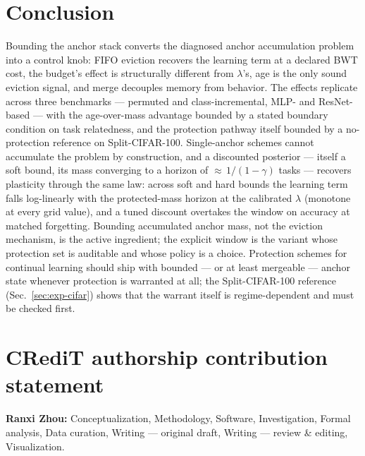 \documentclass[review,12pt,number]{elsarticle}
\begin{document}
\section{Conclusion}
\label{sec:conclusion}

Bounding the anchor stack converts the diagnosed anchor accumulation
problem into a control knob: FIFO eviction recovers the learning
term at a declared BWT cost, the budget's effect is structurally
different from $\lambda$'s, age is the only sound eviction signal,
and merge decouples memory from behavior. The effects replicate
across three benchmarks --- permuted and class-incremental, MLP- and
ResNet-based --- with the age-over-mass advantage bounded by a stated
boundary condition on task relatedness, and the protection pathway
itself bounded by a no-protection reference on Split-CIFAR-100.
Single-anchor schemes cannot accumulate the problem by construction,
and a discounted posterior --- itself a soft bound, its mass
converging to a horizon of ${\approx}\,1/(1-\gamma)$ tasks --- recovers
plasticity through the same law: across soft and hard bounds the
learning term falls log-linearly with the protected-mass horizon at
the calibrated $\lambda$ (monotone at every grid value), and a tuned
discount overtakes the window on accuracy at matched forgetting.
Bounding accumulated anchor mass, not the eviction mechanism, is the
active ingredient; the explicit window is the variant whose protection
set is auditable and whose policy is a choice.
Protection schemes for
continual learning should ship with bounded --- or at least
mergeable --- anchor state whenever protection is warranted at all;
the Split-CIFAR-100 reference (Sec.~\ref{sec:exp-cifar}) shows that
the warrant itself is regime-dependent and must be checked first.


\section*{CRediT authorship contribution statement}
\textbf{Ranxi Zhou:} Conceptualization, Methodology, Software,
Investigation, Formal analysis, Data curation, Writing --- original
draft, Writing --- review \& editing, Visualization.
\end{document}
